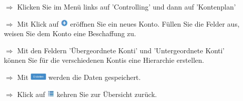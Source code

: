 \documentclass{article}
\begin{document}
\begin{multicols}{2}

\begin{tcolorbox}[colback=blue!5,colframe=blue!40!black,title=Kontenplan erstellen]
\begin{itemize}
  \item[$\Longrightarrow$] Klicken Sie im Menü links auf 'Controlling' und dann auf 'Kontenplan'
  \item[$\Longrightarrow$] Mit Klick auf \includegraphics[height=10pt]{Icons/Plussymbol.jpg} eröffnen Sie ein neues Konto. Füllen Sie die Felder aus, weisen Sie dem Konto eine Beschaffung zu.
	\item[$\Longrightarrow$] Mit den Feldern 'Übergeordnete Konti' und 'Untergeordnete Konti' können Sie für die verschiedenen Kontis eine Hierarchie erstellen.
  \item[$\Longrightarrow$] Mit \includegraphics[height=10pt]{Icons/B_Erstellen.jpg} werden die Daten gespeichert.
  \item[$\Longrightarrow$] Klick auf \includegraphics[height=10pt]{Icons/Listensymbol_zurueck.jpg} kehren Sie zur Übersicht zurück. 
\end{itemize}
\begin{centering}
\end{centering}
\end{tcolorbox}



\end{multicols}
\end{document}
